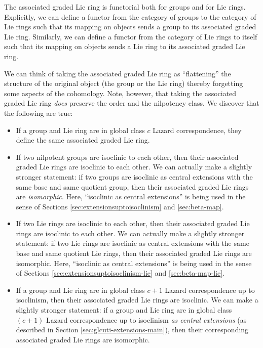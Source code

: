 The associated graded Lie ring is functorial both for groups and for
Lie rings. Explicitly, we can define a functor from the category of
groups to the category of Lie rings such that its mapping on objects
sends a group to its associated graded Lie ring. Similarly, we can
define a functor from the category of Lie rings to itself such that
its mapping on objects sends a Lie ring to its associated graded Lie
ring.

We can think of taking the associated graded Lie ring as
``flattening'' the structure of the original object (the group or the
Lie ring) thereby forgetting some aspects of the cohomology. Note,
however, that taking the associated graded Lie ring {\em does}
preserve the order and the nilpotency class. We discover that the
following are true:

\begin{itemize}
\item If a group and Lie ring are in global class $c$ Lazard
  correspondence, they define the same associated graded Lie ring.
\item If two nilpotent groups are isoclinic to each other, then their
  associated graded Lie rings are isoclinic to each other. We can
  actually make a slightly stronger statement: if two groups are
  isoclinic as central extensions with the same base and same quotient
  group, then their associated graded Lie rings are {\em
    isomorphic}. Here, ``isoclinic as central extensions'' is being
  used in the sense of Sections \ref{sec:extensionsuptoisoclinism} and
  \ref{sec:beta-map}.
\item If two Lie rings are isoclinic to each other, then their
  associated graded Lie rings are isoclinic to each other. We can
  actually make a slightly stronger statement: if two Lie rings are
  isoclinic as central extensions with the same base and same quotient
  Lie rings, then their associated graded Lie rings are
  isomorphic. Here, ``isoclinic as central extensions'' is being used
  in the sense of Sections \ref{sec:extensionsuptoisoclinism-lie} and
  \ref{sec:beta-map-lie}.
\item If a group and Lie ring are in global class $c + 1$ Lazard
  correspondence up to isoclinism, then their associated graded Lie
  rings are isoclinic. We can make a slightly stronger statement: if a
  group and Lie ring are in global class $(c + 1)$ Lazard
  correspondence up to isoclinism {\em as central extensions} (as
  described in Section \ref{sec:glcuti-extensions-main}), then their
  corresponding associated graded Lie rings are isomorphic.
\end{itemize}

